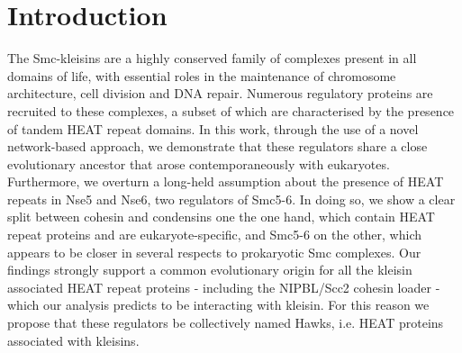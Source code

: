 \documentclass[10pt]{report}
\begin{document}
\section{Introduction}
The Smc-kleisins are a highly conserved family of complexes present in all domains of life, with essential roles in the maintenance of chromosome architecture, cell division and DNA repair. Numerous regulatory proteins are recruited to these complexes, a subset of which are characterised by the presence of tandem HEAT repeat domains. In this work, through the use of a novel network-based approach, we demonstrate that these regulators share a close evolutionary ancestor that arose contemporaneously with eukaryotes. Furthermore, we overturn a long-held assumption about the presence of HEAT repeats in Nse5 and Nse6, two regulators of Smc5-6. In doing so, we show a clear split between cohesin and condensins one the one hand, which contain HEAT repeat proteins and are eukaryote-specific, and Smc5-6 on the other, which appears to be closer in several respects to prokaryotic Smc complexes. Our findings strongly support a common evolutionary origin for all the kleisin associated HEAT repeat proteins - including the NIPBL/Scc2 cohesin loader - which our analysis predicts to be interacting with kleisin. For this reason we propose that these regulators be collectively named Hawks, i.e. HEAT proteins associated with kleisins.
\end{document}
